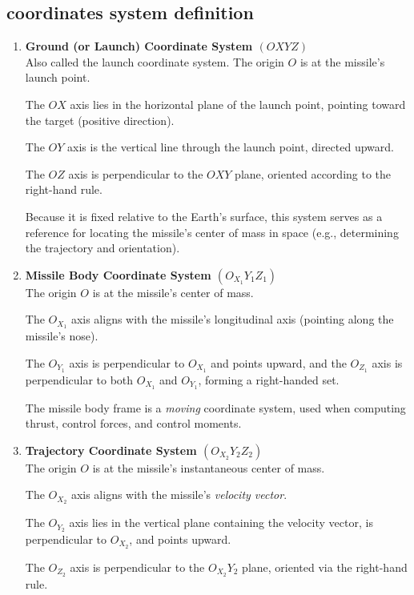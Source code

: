 \documentclass{article}
\begin{document}
\subsection{coordinates system definition}
\begin{enumerate}
  \item \textbf{Ground (or Launch) Coordinate System $(OXYZ)$}\\
  Also called the launch coordinate system. The origin $O$ is at the missile’s launch point.  
  
  The $OX$ axis lies in the horizontal plane of the launch point, pointing toward the target (positive direction).  
  
  The $OY$ axis is the vertical line through the launch point, directed upward.  
  
  The $OZ$ axis is perpendicular to the $OXY$ plane, oriented according to the right-hand rule.  
  
  Because it is fixed relative to the Earth’s surface, this system serves as a reference for locating the missile’s center of mass in space (e.g., determining the trajectory and orientation).
  
  \item \textbf{Missile Body Coordinate System $(O_{X_1}Y_1Z_1)$}\\
  The origin $O$ is at the missile’s center of mass.  
  
  The $O_{X_1}$ axis aligns with the missile’s longitudinal axis (pointing along the missile’s nose).  
  
  The $O_{Y_1}$ axis is perpendicular to $O_{X_1}$ and points upward,  
  and the $O_{Z_1}$ axis is perpendicular to both $O_{X_1}$ and $O_{Y_1}$, forming a right-handed set.  
  
  The missile body frame is a \emph{moving} coordinate system, used when computing thrust, control forces, and control moments.
  
  \item \textbf{Trajectory Coordinate System $(O_{X_2}Y_2Z_2)$}\\
  The origin $O$ is at the missile’s instantaneous center of mass.  
  
  The $O_{X_2}$ axis aligns with the missile’s \emph{velocity vector}.  
  
  The $O_{Y_2}$ axis lies in the vertical plane containing the velocity vector, is perpendicular to $O_{X_2}$, and points upward.  
  
  The $O_{Z_2}$ axis is perpendicular to the $O_{X_2}Y_2$ plane, oriented via the right-hand rule.  
  

\end{enumerate}
\end{document}

